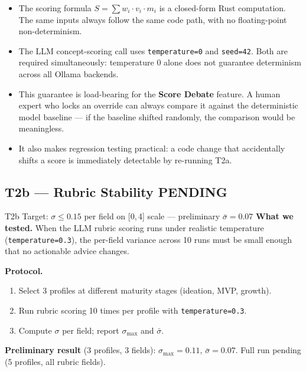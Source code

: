 \documentclass[11pt,a4paper]{article}
\newcommand{\ppending}{\colorbox{PendingBg}{\small\textbf{PENDING}}}
\begin{document}
\begin{itemize}
  \item The scoring formula $S = \sum w_i \cdot v_i \cdot m_i$ is a closed-form Rust
        computation. The same inputs always follow the same code path, with no floating-point
        non-determinism.
  \item The LLM concept-scoring call uses \texttt{temperature=0} and \texttt{seed=42}.
        Both are required simultaneously: temperature 0 alone does not guarantee
        determinism across all Ollama backends.
  \item This guarantee is load-bearing for the \textbf{Score Debate} feature. A human
        expert who locks an override can always compare it against the deterministic
        model baseline — if the baseline shifted randomly, the comparison would be meaningless.
  \item It also makes regression testing practical: a code change that accidentally shifts
        a score is immediately detectable by re-running T2a.
\end{itemize}

\subsection{T2b — Rubric Stability \ppending}

\begin{pendingbox}{T2b Target: $\sigma \leq 0.15$ per field on [0,\,4] scale
— preliminary $\bar{\sigma} = 0.07$}
\textbf{What we tested.}
When the LLM rubric scoring runs under realistic temperature (\texttt{temperature=0.3}),
the per-field variance across 10 runs must be small enough that no actionable advice changes.

\textbf{Protocol.}
\begin{enumerate}
  \item Select 3 profiles at different maturity stages (ideation, MVP, growth).
  \item Run rubric scoring 10 times per profile with \texttt{temperature=0.3}.
  \item Compute $\sigma$ per field; report $\sigma_\text{max}$ and $\bar{\sigma}$.
\end{enumerate}

\textbf{Preliminary result} (3 profiles, 3 fields):
$\sigma_\text{max} = 0.11$, $\bar{\sigma} = 0.07$.
Full run pending (5 profiles, all rubric fields).
\end{pendingbox}
\end{document}
